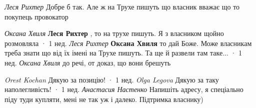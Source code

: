 \begin{itemize}
\emph{Леся Рихтер}
Добре б так. Але ж на Трухе пишуть що власник вважає що то покупець провокатор

\begin{itemize}
\emph{Оксана Хвиля}
\textbf{Леся Рихтер} , то на трухе пишуть. Я з власником щойно розмовляла
 · 1 нед.
\emph{Леся Рихтер}
\textbf{Оксана Хвиля} то дай Боже. Може власникам треба знати що від їх імені на Трухе пишуть. Та ще й развели там таке...
 · 1 нед.
\emph{Оксана Хвиля}
до речі, от доказ, що вони брешуть
\end{itemize}

\emph{Orest Kochan}
Дякую за позицію!
 · 1 нед.
\emph{Olga Legova}
Дякую за таку наполегливість!
 · 1 нед.
\emph{Анастасия Настенко}
Напишіть адресу, я спеціально піду туди купляти, мені не так уж і далеко. Підтримка власнику)

\end{itemize}


